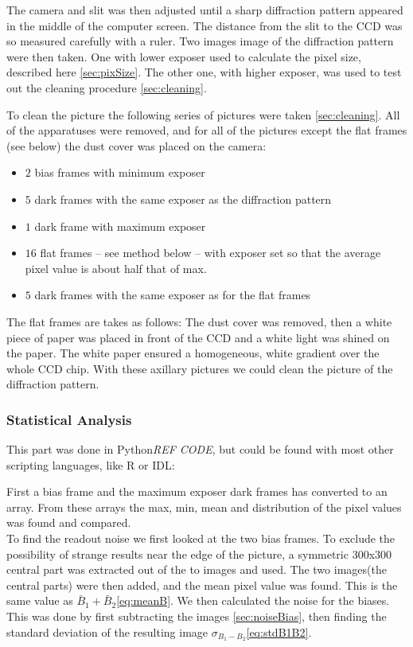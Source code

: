 \documentclass{emulateapj}
\begin{document}
The camera and slit was then adjusted until a sharp diffraction pattern appeared in the middle of the computer screen. The distance from the slit to the CCD was so measured carefully with a ruler. Two images image of the diffraction pattern were then taken. One with lower exposer used to calculate the pixel size, described here \ref{sec:pixSize}. The other one, with higher exposer, was used to test out the cleaning procedure \ref{sec:cleaning}.


To clean the picture the following series of pictures were taken \ref{sec:cleaning}. All of the apparatuses were removed, and for all of the pictures except the flat frames (see below) the dust cover was placed on the camera: \\


\begin{itemize}
\item $2$ bias frames with minimum exposer
\item $5$ dark frames with the same exposer as the diffraction pattern
\item $1$ dark frame with maximum exposer
\item $16$ flat frames -- see method below -- with exposer set so that the average pixel value is about half that of max.
\item $5$ dark frames with the same exposer as for the flat frames
\end{itemize}

The flat frames are takes as follows: The dust cover was removed, then a white piece of paper was placed in front of the CCD and a white light was shined on the paper. The white paper ensured a homogeneous, white gradient over the whole CCD chip. With these axillary pictures we could clean the picture of the diffraction pattern.

\subsubsection{Statistical Analysis}
This part was done in Python\emph{REF CODE}, but could be found with most other scripting languages, like R or IDL:

First a bias frame and the maximum exposer dark frames has converted to an array. From these arrays the max, min, mean and distribution of the pixel values was found and compared. \\

To find the readout noise we first looked at the two bias frames. To exclude the possibility of strange results near the edge of the picture, a symmetric $300$x$300$ central part was extracted out of the to images and used. The two  images(the central parts) were then added, and the mean pixel value was found. This is the same value as $\bar{B}_1 + \bar{B}_2$\eqref{eq:meanB}. We then calculated the noise for the biases. This was done by first subtracting the images \ref{sec:noiseBias}, then finding the standard deviation of the resulting image $\sigma_{B_1 - B_2}$\eqref{eq:stdB1B2}.
\end{document}

